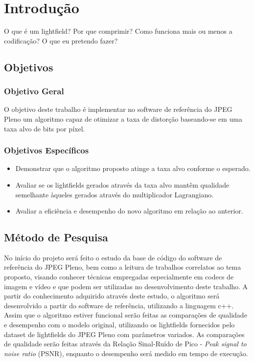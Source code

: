 \chapter{Introdução}
O que é um lightfield?
Por que comprimir?
Como funciona mais ou menos a codificação? \cite{lightfields_survey}
O que eu pretendo fazer?

\section{Objetivos}
    \subsection{Objetivo Geral}
        O objetivo deste trabalho é implementar no software de referência do JPEG Pleno um algoritmo capaz de otimizar 
        a taxa de distorção baseando-se em uma taxa alvo de bits por píxel.
    
    \subsection{Objetivos Específicos}
        \begin{itemize}
            \item Demonstrar que o algoritmo proposto atinge a taxa alvo conforme o esperado.
            \item Avaliar se os lightfields gerados através da taxa alvo mantêm qualidade semelhante àqueles gerados através do multiplicador Lagrangiano.
            \item Avaliar a eficiência e desempenho do novo algoritmo em relação ao anterior.
        \end{itemize}

\section{Método de Pesquisa}
    No início do projeto será feito o estudo da base de código do software de referência do JPEG Pleno, bem como a leitura de trabalhos correlatos ao tema proposto, 
    visando conhecer técnicas empregadas especialmente em codecs de imagem e vídeo e que podem ser utilizadas no desenvolvimento deste trabalho.
    A partir do conhecimento adquirido através deste estudo, o algoritmo será desenvolvido a partir do software de referência, utilizando a linguagem c++.
    Assim que o algoritmo estiver funcional serão feitas as comparações de qualidade e desempenho com o modelo original, utilizando os lightfields fornecidos pelo
    dataset de lightfields do JPEG Pleno com parâmetros variados. As comparações de qualidade serão feitas através da Relação Sinal-Ruído de Pico - 
    \textit{Peak signal to noise ratio} (PSNR), enquanto o desempenho será medido em tempo de execução.

